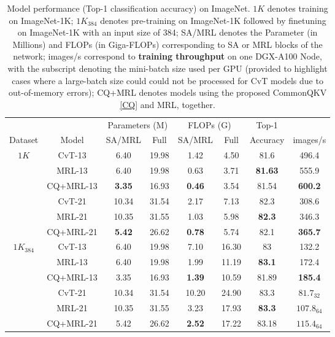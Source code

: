 \documentclass{article}
\begin{document}
\begin{table}[htbp]
  \centering
  \caption{Model performance (Top-1 classification accuracy) on ImageNet. $1K$ denotes training on ImageNet-1K; {\selectfont $1K_{384}$} denotes pre-training on ImageNet-1K followed by finetuning on ImageNet-1K with an input size of 384; {\selectfont SA/MRL} denotes the Parameter (in Millions) and FLOPs (in Giga-FLOPs) corresponding to SA or MRL blocks of the network; {\selectfont  images/s} correspond to \textbf{training throughput} on one DGX-A100 Node, with the subscript denoting the mini-batch size used per GPU (provided to highlight cases where a large-batch size could could not be processed for CvT models due to out-of-memory errors); {\selectfont CQ+MRL} denotes models using the proposed CommonQKV \ref{CQ} and MRL, together.} \label{table:ImagentresultsAppendix}
    \begin{tabular}{c|l|cc|cc|c|c}
    \toprule
    \multicolumn{1}{c}{} &       & \multicolumn{2}{c|}{Parameters (M)} & \multicolumn{2}{c|}{FLOPs (G)} & \multicolumn{1}{c}{Top-1} & \\
    \multicolumn{1}{c|}{Dataset} & \multicolumn{1}{c|}{Model} & SA/MRL & Full  & SA/MRL & Full  & \multicolumn{1}{c|}{Accuracy} & images/s \\
    \midrule
    \multirow{6}[4]{*}{$1K$} & \multicolumn{1}{c|}{CvT-13} & 6.40  & 19.98 & 1.42  & 4.50  & 81.6  & 496.4 \\
          & \multicolumn{1}{c|}{MRL-13} & 6.40  & 19.98 & 0.63  & 3.71  & \textbf{81.63} & 555.9 \\
          & \multicolumn{1}{c|}{CQ+MRL-13} & \textbf{3.35} & 16.93 & \textbf{0.46} & 3.54  & 81.54 & \textbf{600.2} \\
\cmidrule{2-8}          & \multicolumn{1}{c|}{CvT-21} & 10.34 & 31.54 & 2.17  & 7.13  & 82.3  & 308.6 \\
          & \multicolumn{1}{c|}{MRL-21} & 10.35 & 31.55 & 1.03  & 5.98  & \textbf{82.3} & 346.3 \\
          & \multicolumn{1}{c|}{CQ+MRL-21} & \textbf{5.42} & 26.62 & \textbf{0.78} & 5.74  & 82.1  & \textbf{365.7} \\
    \midrule
    \multirow{6}[3]{*}{$1K_{384}$} & \multicolumn{1}{c|}{CvT-13} & 6.40  & 19.98 & 7.10  & 16.30 & 83    & 132.2 \\
          & \multicolumn{1}{c|}{MRL-13} & 6.40  & 19.98 & 1.99 & 11.19 & \textbf{83.1} & 172.4 \\
          & \multicolumn{1}{c|}{CQ+MRL-13} & 3.35  & 16.93 & \textbf{1.39}  & 10.59 & 81.89 & \textbf{185.4} \\
\cmidrule{2-8}          & \multicolumn{1}{c|}{CvT-21} & 10.34 & 31.54 & 10.20 & 24.90 & 83.3  & $81.7_{32}$ \\
          & \multicolumn{1}{c|}{MRL-21} & 10.35 & 31.55 & 3.23  & 17.93 & \textbf{83.3} & $107.8_{64}$ \\
          & CQ+MRL-21 & 5.42  & 26.62 & \textbf{2.52} & 17.22 & 83.18 & \boldmath{}\textbf{$115.4_{64}$}\unboldmath{} \\
    \end{tabular}\end{table}
\end{document}
